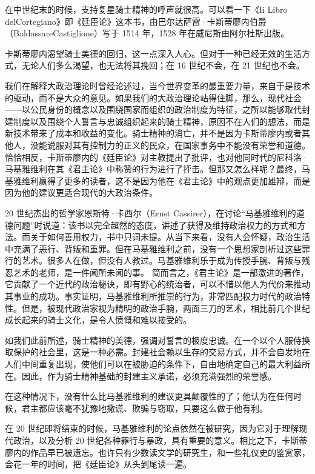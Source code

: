 在中世纪末的时候，支持复星骑士精神的呼声就很高。可以看一下《Ii Libro delCortegiano》即《廷臣论》这本书，由巴尔达萨雷·卡斯蒂廖内伯爵（BaldassareCastiglione）写于 1514 年，1528 年在威尼斯由阿尔杜斯出版。

卡斯蒂廖内渴望骑士美德的回归，这一点深入人心。但对于一种已经无效的生活方式，无论人们多么渴望，也无法将其挽回；在 16 世纪不会，在 21 世纪也不会。

我们在解释大政治理论时曾经论述过，当今世界变革的最重要力量，来自于是技术的驱动，而不是大众的意见。如果我们的大政治理论站得住脚，那么，现代社会——以公民身份的概念以及围绕国家而组织的政治制度为特征，之所以能够取代封建制度以及围绕个人誓言与忠诚组织起来的骑士精神，原因不在人们的想法，而是新技术带来了成本和收益的变化。骑士精神的消亡，并不是因为卡斯蒂廖内或者其他人，没能说服对其有控制力的正义的民众，在国家事务中不能没有荣誉和道德。恰恰相反，卡斯蒂廖内的《廷臣论》对主教提出了批评，也对他同时代的尼科洛·马基雅维利在其《君主论》中称赞的行为进行了抨击。但那又怎么样呢？最终，马基雅维利赢得了更多的读者，这不是因为他在《君主论》中的观点更加雄辩，而是因为他的建议更适合现代的大政治条件。

20 世纪杰出的哲学家恩斯特·卡西尔（Ernst Cassirer），在讨论“马基雅维利的道德问题”时说道：该书以完全超然的态度，讲述了获得及维持政治权力的方式和方法。而关于如何善用权力，书中只词未提。从当下来看，没有人会怀疑，政治生活中充满了恶行、背叛和重罪。但在马基雅维利之前，没有一个思想家剖析过这些罪行的艺术。很多人在做，但没有人教过。马基雅维利乐于成为传授手腕、背叛与残忍艺术的老师，是一件闻所未闻的事。 简而言之，《君主论》是一部激进的著作，它贡献了一个近代的政治秘诀，即有野心的统治者，可以不惜以他人为代价来推动其事业的成功。事实证明，马基雅维利所推崇的行为，非常匹配权力时代的政治特性。但是，被现代政治家视为精明的政治手腕，两面三刀的艺术，相比前几个世纪成长起来的骑士文化，是令人愤慨和难以接受的。

如我们此前所述，骑士精神的美德，强调对誓言的极度忠诚。在一个以个人服侍换取保护的社会里，这是一种必需。封建社会赖以生存的交易方式，并不会自发地在人们中间重复出现，使他们可以在被胁迫的条件下，自由地确定自己的最大利益所在。因此，作为骑士精神基础的封建主义承诺，必须充满强烈的荣誉感。

在这种情况下，没有什么比马基雅维利的建议更具颠覆性的了；他认为在任何时候，君主都应该毫不犹豫地撒谎、欺骗与窃取，只要这么做于他有利。

在 20 世纪即将结束的时候，马基雅维利的论点依然在被研究，因为它对于理解现代政治，以及分析 20 世纪各种罪行与暴政，具有重要的意义。相比之下，卡斯蒂廖内的作品早已被遗忘。也许只有少数读文学的研究生，和一些礼仪史的鉴赏家，会花一年的时间，把《廷臣论》从头到尾读一遍。


